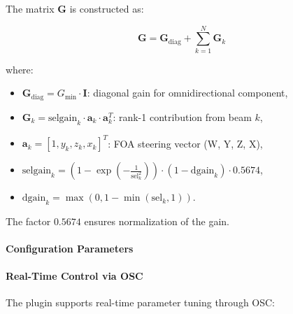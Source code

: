 The matrix $\mathbf{G}$ is constructed as:

\begin{equation}
\mathbf{G} = \mathbf{G}_{\text{diag}} + \sum_{k=1}^{N} \mathbf{G}_k
\end{equation}

where:
\begin{itemize}
  \item $\mathbf{G}_{\text{diag}} = G_{\min} \cdot \mathbf{I}$: diagonal gain for omnidirectional component,
  \item $\mathbf{G}_k = \text{selgain}_k \cdot \mathbf{a}_k \cdot \mathbf{a}_k^T$: rank-1 contribution from beam $k$,
  \item $\mathbf{a}_k = [1, y_k, z_k, x_k]^T$: FOA steering vector (W, Y, Z, X),
  \item $\text{selgain}_k = \left(1 - \exp\left(-\frac{1}{\text{sel}_k^2}\right)\right) \cdot (1 - \text{dgain}_k) \cdot 0.5674$,
  \item $\text{dgain}_k = \max(0, 1 - \min(\text{sel}_k, 1))$.
\end{itemize}

The factor $0.5674$ ensures normalization of the gain.


\paragraph{Configuration Parameters}



\paragraph{Real-Time Control via OSC}

The plugin supports real-time parameter tuning through OSC:


